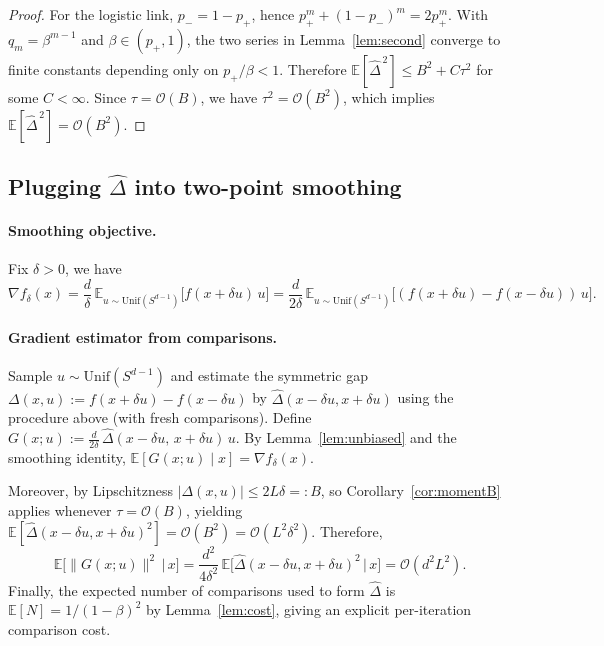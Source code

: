 \documentclass[11pt]{article}
\theoremstyle{plain}
\theoremstyle{remark}
\newcommand{\E}{\mathbb{E}}
\newcommand{\1}{\mathbf{1}}
\begin{document}
\begin{proof}
For the logistic link, $p_- = 1-p_+$, hence $p_+^m+(1-p_-)^m=2p_+^m$.
With $q_m=\beta^{m-1}$ and $\beta\in(p_+,1)$, the two series in Lemma~\ref{lem:second} converge to finite constants
depending only on $p_+/\beta<1$. Therefore $\E[\widehat\Delta^{\,2}]\le B^2 + C\tau^2$ for some $C<\infty$.
Since $\tau=\mathcal{O}(B)$, we have $\tau^2=\mathcal{O}(B^2)$, which implies $\E[\widehat\Delta^{\,2}]=\mathcal{O}(B^2)$.
\end{proof}

\subsection{Plugging $\widehat\Delta$ into two-point smoothing}
\label{sec:plug_smoothing}

\paragraph{Smoothing objective.}
Fix $\delta>0$, we have
\[
\nabla f_\delta(x)
=
\frac{d}{\delta}\,\E_{u\sim \mathrm{Unif}(S^{d-1})}\big[f(x+\delta u)\,u\big]
=
\frac{d}{2\delta}\,\E_{u\sim \mathrm{Unif}(S^{d-1})}\big[(f(x+\delta u)-f(x-\delta u))\,u\big].
\]


\paragraph{Gradient estimator from comparisons.}
Sample $u\sim\mathrm{Unif}(S^{d-1})$ and estimate the symmetric gap
$
\Delta(x,u):=f(x+\delta u)-f(x-\delta u)
$
by $\widehat\Delta(x-\delta u,x+\delta u)$ using the procedure above (with fresh comparisons).
Define
$
G(x;u)
:=
\frac{d}{2\delta}\,\widehat\Delta(x-\delta u,\,x+\delta u)\,u.
$
By Lemma~\ref{lem:unbiased} and the smoothing identity, $\E[G(x;u)\mid x]=\nabla f_\delta(x)$.

Moreover, by Lipschitzness $|\Delta(x,u)|\le 2L\delta=:B$, so Corollary~\ref{cor:momentB} applies whenever
$\tau=\mathcal{O}(B)$, yielding $\E[\widehat\Delta(x-\delta u,x+\delta u)^2]=\mathcal{O}(B^2)=\mathcal{O}(L^2\delta^2)$.
Therefore,
\[
\E\big[\|G(x;u)\|^2 \,\big|\, x\big]
=
\frac{d^2}{4\delta^2}\,\E\big[\widehat\Delta(x-\delta u,x+\delta u)^2 \,\big|\, x\big]
=
\mathcal{O}(d^2 L^2).
\]
Finally, the expected number of comparisons used to form $\widehat\Delta$ is $\E[N]=1/(1-\beta)^2$ by
Lemma~\ref{lem:cost}, giving an explicit per-iteration comparison cost.
\end{document}
